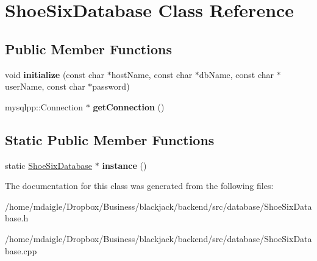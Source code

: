\hypertarget{classShoeSixDatabase}{
\section{\-Shoe\-Six\-Database \-Class \-Reference}
\label{d3/d65/classShoeSixDatabase}
}
\subsection*{\-Public \-Member \-Functions}
\begin{DoxyCompactItemize}
\item 
\hypertarget{classShoeSixDatabase_abd277c957c83234d7cc6d479b9e46c95}{
void {\bfseries initialize} (const char $\ast$host\-Name, const char $\ast$db\-Name, const char $\ast$user\-Name, const char $\ast$password)}
\label{d3/d65/classShoeSixDatabase_abd277c957c83234d7cc6d479b9e46c95}

\item 
\hypertarget{classShoeSixDatabase_a06f7eabaf0c9caadcc381d61290da099}{
mysqlpp\-::\-Connection $\ast$ {\bfseries get\-Connection} ()}
\label{d3/d65/classShoeSixDatabase_a06f7eabaf0c9caadcc381d61290da099}

\end{DoxyCompactItemize}
\subsection*{\-Static \-Public \-Member \-Functions}
\begin{DoxyCompactItemize}
\item 
\hypertarget{classShoeSixDatabase_afbbf1cebd905571bd563a683764e2bf3}{
static \hyperlink{classShoeSixDatabase}{\-Shoe\-Six\-Database} $\ast$ {\bfseries instance} ()}
\label{d3/d65/classShoeSixDatabase_afbbf1cebd905571bd563a683764e2bf3}

\end{DoxyCompactItemize}


\-The documentation for this class was generated from the following files\-:\begin{DoxyCompactItemize}
\item 
/home/mdaigle/\-Dropbox/\-Business/blackjack/backend/src/database/\-Shoe\-Six\-Database.\-h\item 
/home/mdaigle/\-Dropbox/\-Business/blackjack/backend/src/database/\-Shoe\-Six\-Database.\-cpp\end{DoxyCompactItemize}
